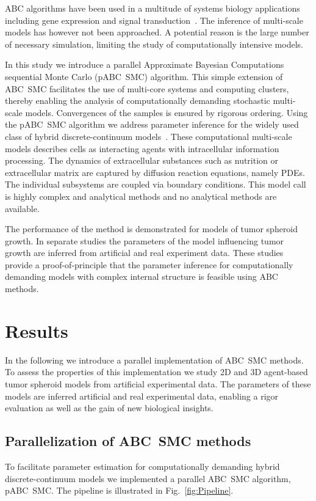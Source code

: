 \documentclass[10pt,letterpaper]{article}
\begin{document}
ABC algorithms have been used in a multitude of systems biology applications including gene expression and signal transduction~\cite{ToniWel2009,ToniJov2011,LillacciKha2013,LiepeFil2013,LoosMar2015}. The inference of multi-scale models has however not been approached. A potential reason is the large number of necessary simulation, limiting the study of computationally intensive models.

In this study we introduce a parallel Approximate Bayesian Computations sequential Monte Carlo (pABC~SMC) algorithm. This simple extension of ABC~SMC facilitates the use of multi-core systems and computing clusters, thereby enabling the analysis of computationally demanding stochastic multi-scale models. Convergences of the samples is ensured by rigorous ordering. Using the pABC~SMC algorithm we address parameter inference for the widely used class of hybrid discrete-continuum models~\cite{AndersonQua2008,RichmondWal2010,SwatTho2012,HoehmeBru2010,Jagiella2012,StarrussBac2014,JagiellaMul2015}. These computational multi-scale models describes cells as interacting agents with intracellular information processing. The dynamics of extracellular substances such as nutrition or extracellular matrix are captured by diffusion reaction equations, namely PDEs. The individual subsystems are coupled via boundary conditions. This model call is highly complex and analytical methods and no analytical methods are available.

The performance of the method is demonstrated for models of tumor spheroid growth. In separate studies the parameters of the model influencing tumor growth are inferred from artificial and real experiment data. These studies provide a proof-of-principle that the parameter inference for computationally demanding models with complex internal structure is feasible using ABC methods.

\section*{Results}

In the following we introduce a parallel implementation of ABC~SMC methods. To assess the properties of this implementation we study 2D and 3D agent-based tumor spheroid models from artificial experimental data. The parameters of these models are inferred artificial and real experimental data, enabling a rigor evaluation as well as the gain of new biological insights.

\subsection*{Parallelization of ABC~SMC methods}
To facilitate parameter estimation for computationally demanding hybrid discrete-continuum models we implemented a parallel ABC~SMC algorithm, pABC~SMC. The pipeline is illustrated in Fig.~\ref{fig:Pipeline}. 
\end{document}
